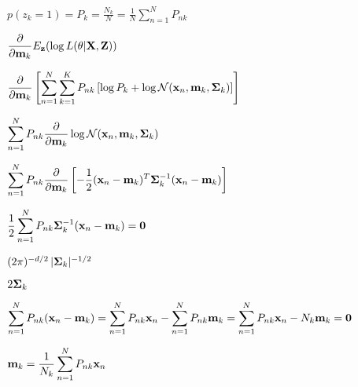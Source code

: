 \documentclass{article}
\def\lthtmlcheckvsize{\ifdim\ht\sizebox<\vsize 
  \ifdim\wd\sizebox<\hsize\expandafter\hfill\fi \expandafter\vfill
  \else\expandafter\vss\fi}%
\begin{document}
{\newpage\clearpage
{}%
$\displaystyle p(z_k=1)=P_k=\frac{N_k}{N}=\frac{1}{N}\sum_{n=1}^N P_{nk}$%
\lthtmlindisplaymathZ
\lthtmlcheckvsize\clearpage}

{\newpage\clearpage
{}%
$\displaystyle \frac{\partial}{\partial{\bf m}_k} E_{\bf z}(\log L(\theta|{\bf X},{\bf Z}))$%
\lthtmlindisplaymathZ
\lthtmlcheckvsize\clearpage}

{\newpage\clearpage
{}%
$\displaystyle \frac{\partial}{\partial{\bf m}_k}
\left[\sum_{n=1}^N \sum_{k=1}^K P_{nk}
\left[\log P_k+\log {\cal N}({\bf x}_n,{\bf m}_k,{\bf\Sigma}_k)\right]\right]$%
\lthtmlindisplaymathZ
\lthtmlcheckvsize\clearpage}

{\newpage\clearpage
{}%
$\displaystyle \sum_{n=1}^N P_{nk}\frac{\partial}{\partial{\bf m}_k}
\log {\cal N}({\bf x}_n,{\bf m}_k,{\bf\Sigma}_k)$%
\lthtmlindisplaymathZ
\lthtmlcheckvsize\clearpage}

{\newpage\clearpage
{}%
$\displaystyle \sum_{n=1}^N P_{nk}\frac{\partial}{\partial{\bf m}_k}
\left[-\frac{1}{2}({\bf x}_n-{\bf m}_k)^T{\bf\Sigma}_k^{-1}({\bf x}_n-{\bf m}_k)\right]$%
\lthtmlindisplaymathZ
\lthtmlcheckvsize\clearpage}

{\newpage\clearpage
{}%
$\displaystyle \frac{1}{2}\sum_{n=1}^N P_{nk}{\bf\Sigma}_k^{-1}({\bf x}_n-{\bf m}_k)={\bf0}$%
\lthtmlindisplaymathZ
\lthtmlcheckvsize\clearpage}

{\newpage\clearpage
{}%
$ (2\pi)^{-d/2}\,|{\bf\Sigma}_k|^{-1/2}$%
\lthtmlindisplaymathZ
\lthtmlcheckvsize\clearpage}

{\newpage\clearpage
{}%
$ 2{\bf\Sigma}_k$%
\lthtmlindisplaymathZ
\lthtmlcheckvsize\clearpage}

{\newpage\clearpage
{}%
$\displaystyle \sum_{n=1}^N P_{nk}({\bf x}_n-{\bf m}_k)
=\sum_{n=1}^N P_{nk}{\bf x}_n-\sum_{n=1}^N P_{nk}{\bf m}_k
=\sum_{n=1}^N P_{nk}{\bf x}_n-N_k{\bf m}_k={\bf0}$%
\lthtmlindisplaymathZ
\lthtmlcheckvsize\clearpage}

{\newpage\clearpage
{}%
$\displaystyle {\bf m}_k=\frac{1}{N_k}\sum_{n=1}^N P_{nk}{\bf x}_n$%
\lthtmlindisplaymathZ
\lthtmlcheckvsize\clearpage}
\end{document}
